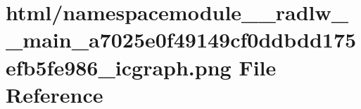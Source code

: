\hypertarget{namespacemodule____radlw____main__a7025e0f49149cf0ddbdd175efb5fe986__icgraph_8png}{}\section{html/namespacemodule\+\_\+\+\_\+radlw\+\_\+\+\_\+main\+\_\+a7025e0f49149cf0ddbdd175efb5fe986\+\_\+icgraph.png File Reference}
\label{namespacemodule____radlw____main__a7025e0f49149cf0ddbdd175efb5fe986__icgraph_8png}
